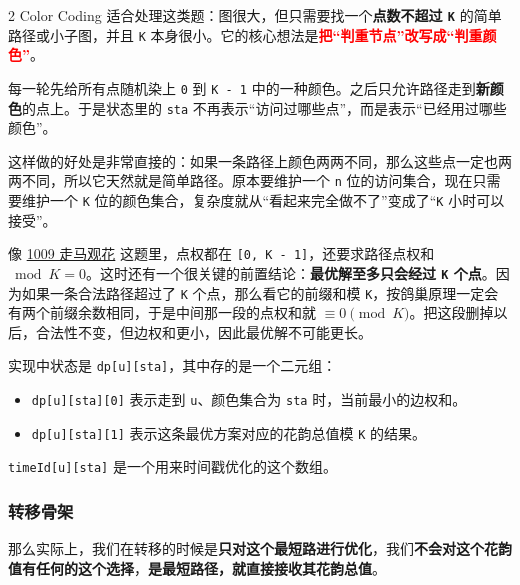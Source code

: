 \begin{multicols*}{2}
		Color Coding 适合处理这类题：图很大，但只需要找一个\textbf{点数不超过 \texttt{K}} 的简单路径或小子图，并且 \texttt{K} 本身很小。它的核心想法是\textcolor{red}{\textbf{把“判重节点”改写成“判重颜色”}}。

		每一轮先给所有点随机染上 \texttt{0} 到 \texttt{K - 1} 中的一种颜色。之后只允许路径走到\textbf{新颜色}的点上。于是状态里的 \texttt{sta} 不再表示“访问过哪些点”，而是表示“已经用过哪些颜色”。

		这样做的好处是非常直接的：如果一条路径上颜色两两不同，那么这些点一定也两两不同，所以它天然就是简单路径。原本要维护一个 \texttt{n} 位的访问集合，现在只需要维护一个 \texttt{K} 位的颜色集合，复杂度就从“看起来完全做不了”变成了“\texttt{K} 小时可以接受”。

		像 \href{https://acm.hdu.edu.cn/contest/problem?cid=1201&pid=1009}{1009 走马观花} 这题里，点权都在 \texttt{[0, K - 1]}，还要求路径点权和 $\bmod K = 0$。这时还有一个很关键的前置结论：\textbf{最优解至多只会经过 \texttt{K} 个点}。因为如果一条合法路径超过了 \texttt{K} 个点，那么看它的前缀和模 \texttt{K}，按鸽巢原理一定会有两个前缀余数相同，于是中间那一段的点权和就 $\equiv 0 \pmod K$。把这段删掉以后，合法性不变，但边权和更小，因此最优解不可能更长。

		实现中状态是 \texttt{dp[u][sta]}，其中存的是一个二元组：

		\begin{itemize}
			\item \texttt{dp[u][sta][0]} 表示走到 \texttt{u}、颜色集合为 \texttt{sta} 时，当前最小的边权和。
			\item \texttt{dp[u][sta][1]} 表示这条最优方案对应的花韵总值模 \texttt{K} 的结果。
		\end{itemize}

		\texttt{timeId[u][sta]} 是一个用来时间戳优化的这个数组。

		\subsubsection{转移骨架}

		那么实际上，我们在转移的时候是\textbf{只对这个最短路进行优化}，我们\textbf{不会对这个花韵值有任何的这个选择}，\textbf{是最短路径，就直接接收其花韵总值}。


\end{multicols*}
